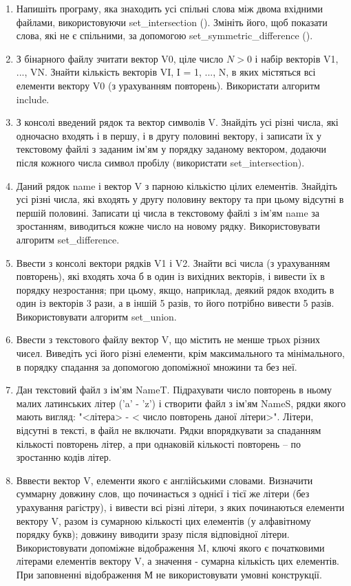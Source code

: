 \documentclass[a5paper,titlepage,openany,twoside,
]
{book_unv}%
\begin{document}
\begin{enumerate}
\begin{enumerate}
\begin{enumerate}
\item
  Напишіть програму, яка знаходить усі спільні слова між двома вхідними
  файлами, використовуючи set\_intersection (). Змініть його, щоб
  показати слова, які не є спільними, за допомогою
  set\_symmetric\_difference ().

\item
З бінарного файлу зчитати вектор V0, ціле число $N > 0$ і набір векторів
V1, ..., VN.  Знайти кількість векторів VI,
I = 1, ..., N, в яких містяться всі елементи вектору V0 (з урахуванням повторень). 
Використати алгоритм include.

\item
З консолі введений рядок та вектор символів V. 
Знайдіть усі різні числа, які одночасно входять
і в першу, і в другу половині вектору, і записати їх 
у текстовому файлі з заданим ім'ям у порядку заданому вектором, додаючи
після кожного числа символ пробілу (використати set\_intersection).
\item
Даний рядок name і вектор V з парною кількістю цілих елементів.
 Знайдіть усі різні числа, які входять у другу половину
вектору та при цьому відсутні в першій половині. Записати 
ці числа в текстовому файлі з ім'ям name за зростанням,
виводиться кожне число на новому рядку. Використовувати алгоритм set\_difference.
\item
Ввести з консолі вектори рядків V1 і V2. Знайти всі числа (з урахуванням повторень),
 які входять хоча б в один із вихідних векторів, і вивести їх
в порядку незростання; при цьому, якщо, наприклад, деякий рядок
входить в один із векторів 3 рази, а в іншій 5 разів, то його потрібно вивести 5 разів.
Використовувати алгоритм set\_union.
\item
Ввести з текстового файлу вектор V, що містить не менше трьох різних чисел.
Виведіть усі його різні елементи, крім максимального та мінімального, 
в порядку спадання за допомогою допоміжної множини та без неї.
\item
  Дан текстовий файл з ім'ям NameT. Підрахувати число повторень в ньому
  малих латинських літер ('a' - 'z') і створити файл з ім'ям NameS,
  рядки якого мають вигляд: "\textless{}літера\textgreater{} -
  \textless{} число повторень даної літери\textgreater{}". Літери,
  відсутні в тексті, в файл не включати. Рядки впорядкувати за спаданням
  кількості повторень літер, а при однаковій кількості повторень -- по
  зростанню кодів літер.

\item
Вввести вектор V, елементи якого є англійськими словами. Визначити суммарну довжину
слов, що починається з однієї і тієї же літери (без урахування рагістру),
 і вивести всі різні літери, з яких починаються елементи вектору V, разом із сумарною кількості цих елементів (у алфавітному порядку букв); довжину виводити зразу 
після відповідної літери. Використовувати допоміжне відображення M, ключі якого є початковими 
літерами елементів вектору V, а значення - сумарна кількість цих елементів. 
При заповненні відображення М не використовувати умовні конструкції.


\end{enumerate}
\end{enumerate}
\end{enumerate}
\end{document}
